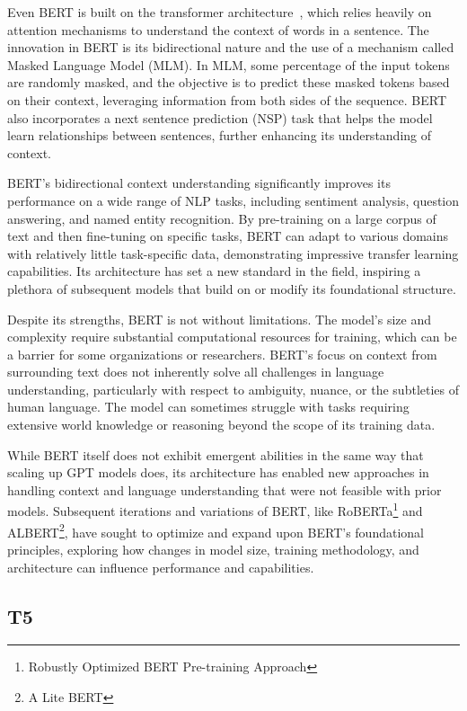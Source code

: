 Even BERT is built on the transformer architecture~\cite{vaswani2023attention}, which relies heavily on attention mechanisms to understand the context of words in a sentence.
The innovation in BERT is its bidirectional nature and the use of a mechanism called Masked Language Model (MLM). In MLM, some percentage of the input tokens are randomly masked, and the objective is to predict these masked tokens based on their context, leveraging information from both sides of the sequence.
BERT also incorporates a next sentence prediction (NSP) task that helps the model learn relationships between sentences, further enhancing its understanding of context.

BERT's bidirectional context understanding significantly improves its performance on a wide range of NLP tasks, including sentiment analysis, question answering, and named entity recognition.
By pre-training on a large corpus of text and then fine-tuning on specific tasks, BERT can adapt to various domains with relatively little task-specific data, demonstrating impressive transfer learning capabilities.
Its architecture has set a new standard in the field, inspiring a plethora of subsequent models that build on or modify its foundational structure.

Despite its strengths, BERT is not without limitations.
The model's size and complexity require substantial computational resources for training, which can be a barrier for some organizations or researchers.
BERT's focus on context from surrounding text does not inherently solve all challenges in language understanding, particularly with respect to ambiguity, nuance, or the subtleties of human language.
The model can sometimes struggle with tasks requiring extensive world knowledge or reasoning beyond the scope of its training data.

While BERT itself does not exhibit emergent abilities in the same way that scaling up GPT models does, its architecture has enabled new approaches in handling context and language understanding that were not feasible with prior models.
Subsequent iterations and variations of BERT, like RoBERTa\footnote{Robustly Optimized BERT Pre-training Approach} and ALBERT\footnote{A Lite BERT}, have sought to optimize and expand upon BERT's foundational principles, exploring how changes in model size, training methodology, and architecture can influence performance and capabilities.

\subsection{T5}
\label{subsec:t5}

